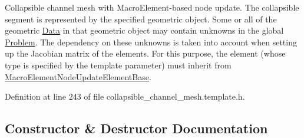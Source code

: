 Collapsible channel mesh with Macro\+Element-\/based node update. The collapsible segment is represented by the specified geometric object. Some or all of the geometric \hyperlink{classoomph_1_1Data}{Data} in that geometric object may contain unknowns in the global \hyperlink{classoomph_1_1Problem}{Problem}. The dependency on these unknowns is taken into account when setting up the Jacobian matrix of the elements. For this purpose, the element (whose type is specified by the template parameter) must inherit from \hyperlink{classoomph_1_1MacroElementNodeUpdateElementBase}{Macro\+Element\+Node\+Update\+Element\+Base}. 

Definition at line 243 of file collapsible\+\_\+channel\+\_\+mesh.\+template.\+h.



\subsection{Constructor \& Destructor Documentation}
\mbox{\label{classoomph_1_1MacroElementNodeUpdateCollapsibleChannelMesh_a5b7f150c4569c8d59d8220980a84cac5}} 
